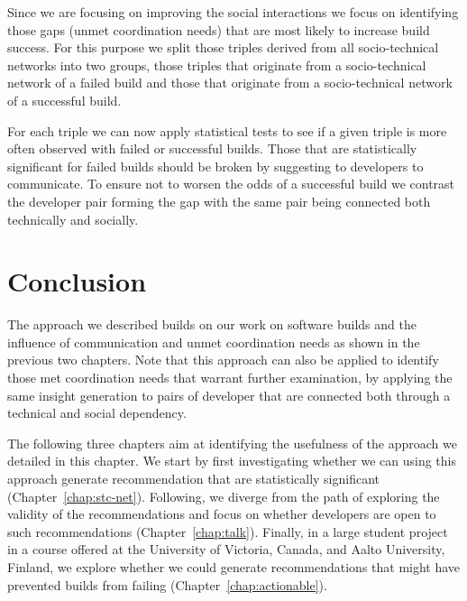 Since we are focusing on improving the social interactions we focus on identifying those gaps (unmet coordination needs) that are most likely to increase build success.
For this purpose we split those triples derived from all socio-technical networks into two groups, those triples that originate from a socio-technical network of a failed build and those that originate from a socio-technical network of a successful build.

For each triple we can now apply statistical tests to see if a given triple is more often observed with failed or successful builds.
Those that are statistically significant for failed builds should be broken by suggesting to developers to communicate.
To ensure not to worsen the odds of a successful build we contrast the developer pair forming the gap with the same pair being connected both technically and socially.

\section{Conclusion}
The approach we described builds on our work on software builds and the influence of communication and unmet coordination needs as shown in the previous two chapters.
Note that this approach can also be applied to identify those met coordination needs that warrant further examination, by applying the same insight generation to pairs of developer that are connected both through a technical and social dependency.

The following three chapters aim at identifying the usefulness of the approach we detailed in this chapter.
We start by first investigating whether we can using this approach generate recommendation that are statistically significant (Chapter~\ref{chap:stc-net}).
Following, we diverge from the path of exploring the validity of the recommendations and focus on whether developers are open to such recommendations (Chapter~\ref{chap:talk}).
Finally, in a large student project in a course offered at the University of Victoria, Canada, and Aalto University, Finland, we explore whether we could generate recommendations that might have prevented builds from failing (Chapter~\ref{chap:actionable}).
